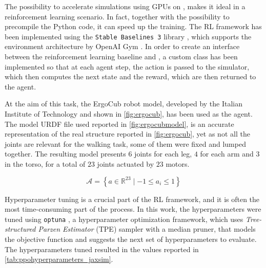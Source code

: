 The possibility to accelerate simulations using \ac{GPU}s on \jaxsim, makes it ideal in a reinforcement learning scenario. In fact, together with the possibility to precompile the Python code, it can speed up the training. The \ac{RL} framework has been implemented using the \texttt{Stable Baselines 3} library \citep{raffin_stable-baselines3_2021}, which supports the environment architecture by OpenAI Gym \citep{brockman_openai_2016}. In order to create an interface between the reinforcement learning baseline and \jaxsim, a custom class has been implemented so that at each agent step, the action is passed to the simulator, which then computes the next state and the reward, which are then returned to the agent.

At the aim of this task, the ErgoCub robot model, developed by the Italian Institute of Technology and shown in \cref{fig:ergocub}, has been used as the agent. The model \ac{URDF} file used reported in \cref{fig:ergocubmodel}, is an accurate representation of the real structure reported in \cref{fig:ergocub}, yet as not all the joints are relevant for the walking task, some of them were fixed and lumped together. The resulting model presents $6$ joints for each leg, $4$ for each arm and $3$ in the torso, for a total of $23$ joints actuated by $23$ motors.

\begin{equation}
    \label{eqn:ergocub_action_space}
    \mathcal{A} = \left\{ a \in \mathbb{R} ^{23} \mid -1 \leq a_i \leq 1 \right\}
\end{equation}

Hyperparameter tuning is a crucial part of the \ac{RL} framework, and it is often the most time-consuming part of the process. In this work, the hyperparameters were tuned using \texttt{optuna} \citep{akiba_optuna_2019}, a hyperparameter optimization framework, which uses \textit{Tree-structured Parzen Estimator} (\ac{TPE}) sampler with a median pruner, that models the objective function and suggests the next set of hyperparameters to evaluate. The hyperparameters tuned resulted in the values reported in \cref{tab:ppohyperparameters_jaxsim}.

